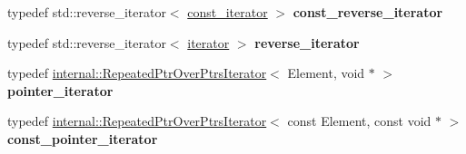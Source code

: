 \begin{DoxyCompactItemize}
\mbox{\label{classgoogle_1_1protobuf_1_1RepeatedPtrField_a0555c6763199953172d50e300e183a2b}} 
typedef std\+::reverse\+\_\+iterator$<$ \hyperlink{classgoogle_1_1protobuf_1_1internal_1_1RepeatedPtrIterator}{const\+\_\+iterator} $>$ {\bfseries const\+\_\+reverse\+\_\+iterator}
\item 
\mbox{\label{classgoogle_1_1protobuf_1_1RepeatedPtrField_a23d0621f584daefcde383265252bf8e5}} 
typedef std\+::reverse\+\_\+iterator$<$ \hyperlink{classgoogle_1_1protobuf_1_1internal_1_1RepeatedPtrIterator}{iterator} $>$ {\bfseries reverse\+\_\+iterator}
\item 
\mbox{\label{classgoogle_1_1protobuf_1_1RepeatedPtrField_adf877398b773ca6b0426f7a6df2b2d28}} 
typedef \hyperlink{classgoogle_1_1protobuf_1_1internal_1_1RepeatedPtrOverPtrsIterator}{internal\+::\+Repeated\+Ptr\+Over\+Ptrs\+Iterator}$<$ Element, void $\ast$ $>$ {\bfseries pointer\+\_\+iterator}
\item 
\mbox{\label{classgoogle_1_1protobuf_1_1RepeatedPtrField_a9f916c9e947e7a63c9f485f230fc1715}} 
typedef \hyperlink{classgoogle_1_1protobuf_1_1internal_1_1RepeatedPtrOverPtrsIterator}{internal\+::\+Repeated\+Ptr\+Over\+Ptrs\+Iterator}$<$ const Element, const void $\ast$ $>$ {\bfseries const\+\_\+pointer\+\_\+iterator}
\end{DoxyCompactItemize}
